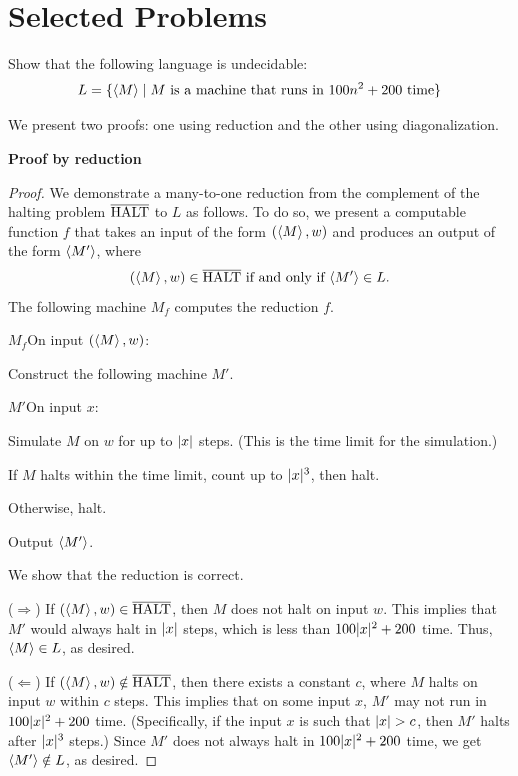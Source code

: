   \section{Selected Problems}
  \begin{problem}
    Show that the following language is undecidable:
    \[ L = \{ \left< M \right> \mid \text{$M$ is a machine that runs in $100 n^2 + 200$ time} \} \]

    \begin{sol}
      We present two proofs: one using reduction and the other using diagonalization.

      \textbf{Proof by reduction}

      \begin{proof}
        We demonstrate a many-to-one reduction from the complement of the halting problem $\overline{\text{HALT}}$ to $L$ as follows. To do so, we present a computable function $f$ that takes an input of the form $(\left< M \right>, w)$ and produces an output of the form $\left< M' \right>$, where
        \[ \text{$(\left< M \right>, w) \in \overline{\text{HALT}}$ if and only if $\left< M' \right> \in L$.} \]
        The following machine $M_f$ computes the reduction $f$.
        \begin{turing}{$M_f$}{On input $(\left< M \right>, w)$:}
        \item Construct the following machine $M'$.
          \begin{turing}{$M'$}{On input $x$:}
          \item Simulate $M$ on $w$ for up to $| x |$ steps. (This is the time limit for the simulation.)
          \item If $M$ halts within the time limit, count up to $| x |^3$, then halt.
          \item Otherwise, halt.
          \end{turing}
        \item Output $\left< M' \right>$.
        \end{turing}

        We show that the reduction is correct.

        ($\Rightarrow$) If $(\left< M \right>, w) \in \overline{\text{HALT}}$, then $M$ does not halt on input $w$. This implies that $M'$ would always halt in $| x |$ steps, which is less than $100 | x |^2 + 200$ time. Thus, $\left< M \right> \in L$, as desired.

        ($\Leftarrow$) If $(\left< M \right>, w) \notin \overline{\text{HALT}}$, then there exists a constant $c$, where $M$ halts on input $w$ within $c$ steps. This implies that on some input $x$, $M'$ may not run in $100 | x |^2 + 200$ time. (Specifically, if the input $x$ is such that $| x | > c$, then $M'$ halts after $| x |^3$ steps.) Since $M'$ does not always halt in $100 | x |^2 + 200$ time, we get $\left< M' \right> \notin L$, as desired.


\end{proof}
\end{sol}
\end{problem}
